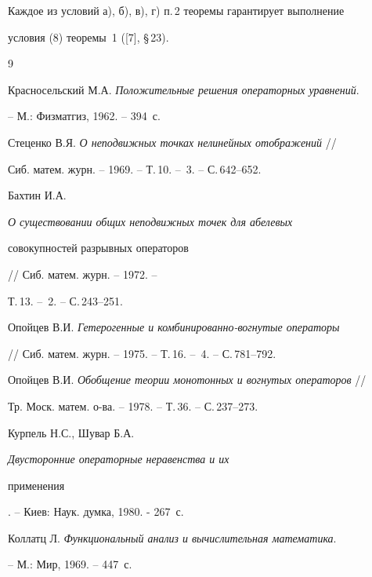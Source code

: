 Каждое из условий а), б), в), г) п.\,2 теоремы гарантирует выполнение


условия (8) теоремы~1 ([7], \S\,23).





\begin{thebibliography}{9}







Красносельский М.А. {\em Положительные решения операторных уравнений}.


-- М.: Физматгиз, 1962. -- 394~с.







Стеценко В.Я. {\em О неподвижных точках нелинейных отображений} //


Сиб. матем. журн. -- 1969. -- Т.\,10. -- \No\,3. -- С.\,642--652.







Бахтин И.А. {\em О существовании общих неподвижных точек для абелевых


совокупностей разрывных операторов} // Сиб. матем. журн. -- 1972. --


Т.\,13. -- \No\,2. -- С.\,243--251.




Опойцев В.И. {\em Гетерогенные и комбинированно-вогнутые операторы}


// Сиб. матем. журн. -- 1975. -- Т.\,16. -- \No\,4. -- С.\,781--792.




Опойцев В.И. {\em Обобщение теории монотонных и вогнутых операторов} //


Тр. Моск. матем. о-ва. -- 1978. -- Т.\,36. -- С.\,237--273.




Курпель Н.С., Шувар Б.А. {\em Двусторонние операторные неравенства и их


применения}. -- Киев: Наук. думка, 1980. - 267~с.




Коллатц Л. {\em Функциональный анализ и вычислительная математика}.


-- М.: Мир, 1969. -- 447~с.





\end{thebibliography}





\vskip 0.5cm












\label{end}





